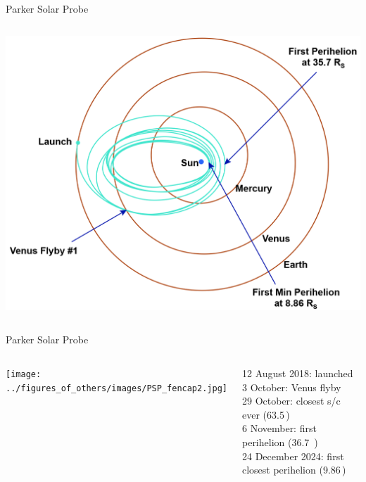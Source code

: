 \begin{frame}[plain,c]{Parker Solar Probe}{}
	\begin{columns}[c]
		
		
		
		
		\includegraphics[width=\textwidth]{../figures_of_others/images/PSP_MissionDesign2_negative_crop.png}

	\end{columns}
\end{frame}
\begin{frame}[plain,c]{Parker Solar Probe}{}
	\begin{columns}[c]
		
		\texttt{[image: ../figures\_of\_others/images/PSP\_fencap2.jpg]}


		12 August 2018: launched\\
		3 October: Venus flyby\\
		29 October: closest s/c ever (63.5\,\Rs{})\\
		6 November: first perihelion (36.7~\Rs{})\\
		24 December 2024: first closest perihelion (9.86\,\Rs{})
	\end{columns}
\end{frame}
